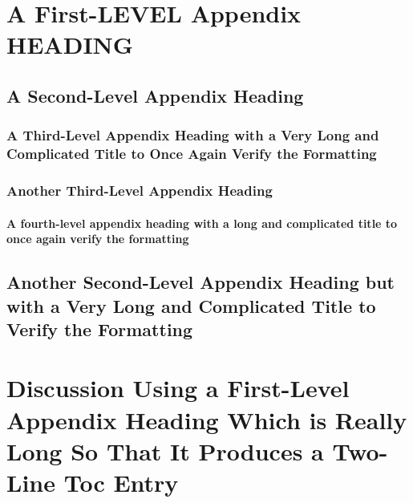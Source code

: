 


\section{A First-LEVEL Appendix HEADING}
\lipsum[7-9]

\subsection{A Second-Level Appendix Heading}
\lipsum[10]
\subsubsection{A Third-Level Appendix Heading with a Very Long and
  Complicated Title to Once Again Verify the Formatting}
\lipsum[10-12]
\subsubsection{Another Third-Level Appendix Heading}
\lipsum[10-12]
\paragraph{A fourth-level appendix heading with a long and complicated title
to once again verify the formatting}
\lipsum[13-15]

\subsection{Another Second-Level Appendix Heading but with a
Very Long and Complicated Title to Verify the Formatting}
\lipsum[13-15]

\section{Discussion Using a First-Level Appendix Heading
  Which is Really Long So That It Produces a Two-Line
  Toc Entry}
\lipsum[10-12]


\endinput
